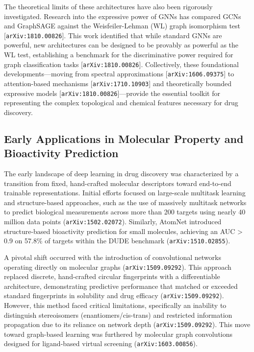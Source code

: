 \documentclass[11pt]{article}
\begin{document}
The theoretical limits of these architectures have also been rigorously investigated. Research into the expressive power of GNNs has compared GCNs and GraphSAGE against the Weisfeiler-Lehman (WL) graph isomorphism test [\texttt{arXiv:1810.00826}]. This work identified that while standard GNNs are powerful, new architectures can be designed to be provably as powerful as the WL test, establishing a benchmark for the discriminative power required for graph classification tasks [\texttt{arXiv:1810.00826}]. Collectively, these foundational developments—moving from spectral approximations [\texttt{arXiv:1606.09375}] to attention-based mechanisms [\texttt{arXiv:1710.10903}] and theoretically bounded expressive models [\texttt{arXiv:1810.00826}]—provide the essential toolkit for representing the complex topological and chemical features necessary for drug discovery.

\subsection{Early Applications in Molecular Property and Bioactivity Prediction}

The early landscape of deep learning in drug discovery was characterized by a transition from fixed, hand-crafted molecular descriptors toward end-to-end trainable representations. Initial efforts focused on large-scale multitask learning and structure-based approaches, such as the use of massively multitask networks to predict biological measurements across more than 200 targets using nearly 40 million data points (\texttt{arXiv:1502.02072}). Similarly, AtomNet introduced structure-based bioactivity prediction for small molecules, achieving an AUC > 0.9 on 57.8\% of targets within the DUDE benchmark (\texttt{arXiv:1510.02855}).

A pivotal shift occurred with the introduction of convolutional networks operating directly on molecular graphs (\texttt{arXiv:1509.09292}). This approach replaced discrete, hand-crafted circular fingerprints with a differentiable architecture, demonstrating predictive performance that matched or exceeded standard fingerprints in solubility and drug efficacy (\texttt{arXiv:1509.09292}). However, this method faced critical limitations, specifically an inability to distinguish stereoisomers (enantiomers/cis-trans) and restricted information propagation due to its reliance on network depth (\texttt{arXiv:1509.09292}). This move toward graph-based learning was furthered by molecular graph convolutions designed for ligand-based virtual screening (\texttt{arXiv:1603.00856}).
\end{document}
